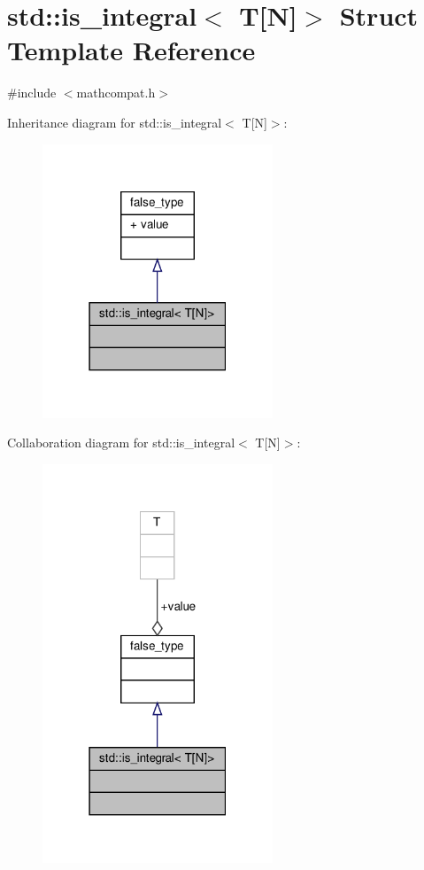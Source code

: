 \hypertarget{structstd_1_1is__integral_3_01T[N]_4}{}\section{std\+:\+:is\+\_\+integral$<$ T\mbox{[}N\mbox{]}$>$ Struct Template Reference}
\label{structstd_1_1is__integral_3_01T[N]_4}


{\ttfamily \#include $<$mathcompat.\+h$>$}



Inheritance diagram for std\+:\+:is\+\_\+integral$<$ T\mbox{[}N\mbox{]}$>$\+:\nopagebreak
\begin{figure}[H]
\begin{center}
\leavevmode
\includegraphics[width=195pt]{d3/d78/structstd_1_1is__integral_3_01T[N]_4__inherit__graph}
\end{center}
\end{figure}


Collaboration diagram for std\+:\+:is\+\_\+integral$<$ T\mbox{[}N\mbox{]}$>$\+:\nopagebreak
\begin{figure}[H]
\begin{center}
\leavevmode
\includegraphics[width=195pt]{de/da4/structstd_1_1is__integral_3_01T[N]_4__coll__graph}
\end{center}
\end{figure}
